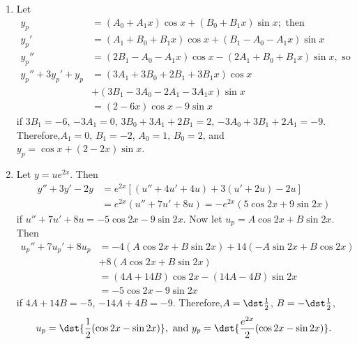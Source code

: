 \documentclass[openany]{book}
\newenvironment{sectionSolutions}{
 \begin{enumerate}[item-label={\thesection.\arabic{enumi}.}]
}{
 \end{enumerate}
}
\begin{document}
\begin{sectionSolutions}
\item
Let
\begin{align*}
y_p&=(A_0+A_1x)\cos x+(B_0+B_1x)\sin x; \text{ then}\\
y_p'&=(A_1+B_0+B_1x)\cos x+(B_1-A_0-A_1x)\sin x\\
y_p''&=(2B_1-A_0-A_1x)\cos x-(2A_1+B_0+B_1x)\sin x, \text{ so}\\
y_p''+3y_p'+y_p&=(3A_1+3B_0+2B_1+3B_1x)\cos x \\
&+(3B_1-3A_0-2A_1-3A_1x)\sin x \\
&=(2-6x)\cos x-9\sin x
\end{align*}
if $3B_1=-6$, $-3A_1=0$, $3B_0+3A_1+2B_1=2$, $-3A_0+3B_1+2A_1=-9$.
Therefore,$A_1=0$,   $B_1=-2$, $A_0=1$, $B_0=2$, and
 $y_p=\cos x+(2-2x)\sin x$.


\item
Let $y=ue^{2x}$. Then
\begin{align*}
y''+3y'-2y&=e^{2x}\left[(u''+4u'+4u)+3(u'+2u)-2u\right]\\
&=e^{2x}(u''+7u'+8u)=-e^{2x}(5\cos2x+9\sin2x)
\end{align*}
if $u''+7u'+8u=-5\cos2x-9\sin2x$. Now let $u_p=A\cos2x+B\sin2x$. Then
\begin{align*}
u_p''+7u_p'+8u_p&=-4(A\cos2x+B\sin2x)+14(-A\sin2x+B\cos2x)\\
&+8(A\cos2x+B\sin2x)\\
&=(4A+14B)\cos2x-(14A-4B)\sin2x\\
&=-5\cos2x-9\sin2x
\end{align*}
if $4A+14B=-5$, $-14A+4B=-9$. Therefore,$A=\dst\frac{1}{2}$,
$B=-\dst\frac{1}{2}$,
\[
 u_p=\dst{\frac{1}{2}(\cos2x-\sin2x)}, \text{ and }
y_p=\dst{\frac{e^{2x}}{2}(\cos2x-\sin2x)}.
\]



\end{sectionSolutions}
\end{document}
